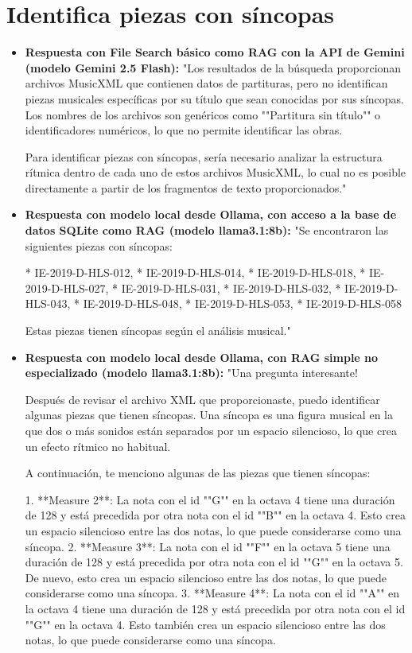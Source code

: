 \section{Identifica piezas con síncopas}
\begin{itemize}
    \item \textbf{Respuesta con File Search básico como RAG con la API de Gemini (modelo Gemini 2.5 Flash):} "Los resultados de la búsqueda proporcionan archivos MusicXML que contienen datos de partituras, pero no identifican piezas musicales específicas por su título que sean conocidas por sus síncopas. Los nombres de los archivos son genéricos como ""Partitura sin título"" o identificadores numéricos, lo que no permite identificar las obras.

Para identificar piezas con síncopas, sería necesario analizar la estructura rítmica dentro de cada uno de estos archivos MusicXML, lo cual no es posible directamente a partir de los fragmentos de texto proporcionados."
    \item \textbf{Respuesta con modelo local desde Ollama, con acceso a la base de datos SQLite como RAG (modelo llama3.1:8b):} "Se encontraron las siguientes piezas con síncopas:

* IE-2019-D-HLS-012,
* IE-2019-D-HLS-014,
* IE-2019-D-HLS-018,
* IE-2019-D-HLS-027,
* IE-2019-D-HLS-031,
* IE-2019-D-HLS-032,
* IE-2019-D-HLS-043,
* IE-2019-D-HLS-048,
* IE-2019-D-HLS-053,
* IE-2019-D-HLS-058

Estas piezas tienen síncopas según el análisis musical."
\item \textbf{Respuesta con modelo local desde Ollama, con RAG simple no especializado (modelo llama3.1:8b):} "Una pregunta interesante!

Después de revisar el archivo XML que proporcionaste, puedo identificar algunas piezas que tienen síncopas. Una síncopa es una figura musical en la que dos o más sonidos están separados por un espacio silencioso, lo que crea un efecto rítmico no habitual.

A continuación, te menciono algunas de las piezas que tienen síncopas:

1. **Measure 2**: La nota con el id ""G"" en la octava 4 tiene una duración de 128 y está precedida por otra nota con el id ""B"" en la octava 4. Esto crea un espacio silencioso entre las dos notas, lo que puede considerarse como una síncopa.
2. **Measure 3**: La nota con el id ""F"" en la octava 5 tiene una duración de 128 y está precedida por otra nota con el id ""G"" en la octava 5. De nuevo, esto crea un espacio silencioso entre las dos notas, lo que puede considerarse como una síncopa.
3. **Measure 4**: La nota con el id ""A"" en la octava 4 tiene una duración de 128 y está precedida por otra nota con el id ""G"" en la octava 4. Esto también crea un espacio silencioso entre las dos notas, lo que puede considerarse como una síncopa.


\end{itemize}
